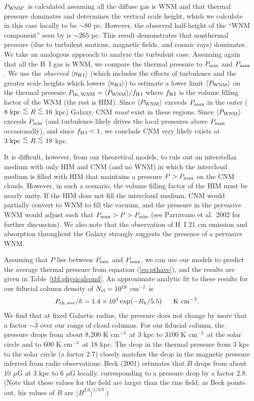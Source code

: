 \documentclass[12pt,preprint,flushrt]{aastex}
\newcommand{\beq}{\begin{equation}}
\newcommand{\eeq}{\end{equation}}
\newcommand{\ee}{$^{-2}$}
\newcommand{\eee}{$^{-3}$}
\newcommand{\pmax}{P_{\rm max}}
\newcommand{\pmin}{P_{\rm min}}
\newcommand{\al}{\mbox{ \raisebox{-.4ex}{$\stackrel{\textstyle <}{\sim}$} }}
\begin{document}
$P_{\rm WNM'}$ is calculated assuming all the diffuse gas is WNM and that 
thermal pressure dominates and determines the vertical scale height,
which we calculate in this case locally to be $\sim 80$ pc. However,
the observed half-height of the ``WNM component'' seen by
\cite{dic90} is $\sim 265$ pc. This result demonstrates that nonthermal
pressure (due to turbulent motions, magnetic fields, and cosmic rays)
dominates. 
We take an analogous approach to
analyze the turbulent case. Assuming again that all the H~I gas
is WNM, we compare the thermal pressure to $\pmin$ and $\pmax$. We
use the {\em observed} $\langle n_{\rm H\, I} \rangle$  (which includes
the effects of turbulence and the greater scale heights which lowers
$\langle n_{\rm H\, I} \rangle$) to estimate a lower limit 
$\langle P_{\rm WNM} \rangle$ on the thermal pressure
$P_{\rm th,\, WNM} = \langle P_{\rm WNM} \rangle/f_{\rm H\, I}$ 
where $f_{\rm H\, I}$ is the volume filling factor of the WNM
(the rest is HIM). Since $\langle P_{\rm WNM} \rangle$ exceeds 
$\pmax$ in the outer ($8\,\, {\rm kpc} \al R \al 16$ kpc) Galaxy, 
CNM {\em must}
exist in these regions. Since $\langle P_{\rm WNM} \rangle$ exceeds
$\pmin$ (and turbulence likely drives the local pressures above
$\pmax$ occasionally), and since $f_{\rm H\, I} < 1$, we conclude CNM 
very likely exists at $3\,\, {\rm kpc} \al R \al 18$ kpc.

It is difficult, however, from our theoretical models, to
rule out an interstellar medium with only HIM and CNM  (and no WNM)
in which the intercloud
medium is filled with HIM that maintains a pressure  $P > \pmax$
on the CNM clouds. However, in such a scenario, the volume filling factor
of the HIM must be  nearly unity. If the HIM does not fill the
intercloud medium, CNM would partially convert to WNM to fill the vacuum,
and the pressure in the pervasive WNM would adjust such that
$\pmax > P > \pmin$ (see Parravano et al.\ 2002 for further
discussion). We also note that the observation of H~I 21 cm emission 
and absorption throughout the Galaxy strongly suggests the presence
of a pervasive WNM.

Assuming that $P$ lies between $\pmin$ and $\pmax$,
we can use our models to
predict the average thermal
pressure from equation (\ref{eq:pthave}), and the results are
given in Table~\ref{tbl:physicalcond}.
An approximate analytic fit to these results for our
fiducial column density of $N_{\rm cl}=10^{19}$ cm\ee\ is
\beq
P_{\rm th,\, ave}/k =1.4\times 10^4\exp(-R_k/5.5)~~~~~{\rm K~cm^{-3}}.
\eeq
We find that at fixed
Galactic radius, the pressure
does not change by more that a factor $\sim 3$ over our range
of cloud columns.
For our fiducial column, the
pressure drops from about 8,200 K cm\eee\ at 3 kpc to
3100 K cm\eee\ at the solar circle and to 600 K cm\eee\ at
18 kpc.  The drop in the thermal pressure from 3 kpc
to the solar circle (a factor 2.7) closely matches the drop in the
magnetic pressure inferred from radio observations:
Beck (2001) estimates that $B$ drops from about 10 $\mu$G
at 3 kpc to 6 $\mu$G locally, corresponding to a pressure
drop by a factor 2.8. (Note that these values for
the field are larger than the rms field; as Beck points out, his values of
$B$ are $\langle B^{3.9}\rangle^{1/3.9}$.)
\end{document}
